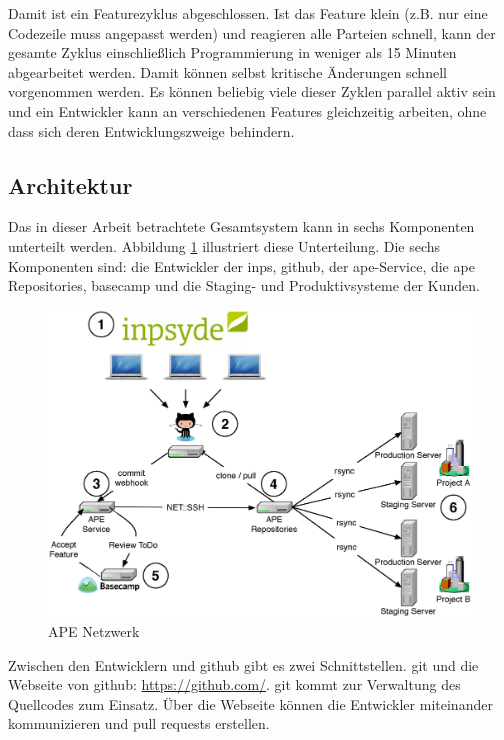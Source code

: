 Damit ist ein Featurezyklus abgeschlossen. Ist das Feature klein (z.B. nur eine Codezeile muss angepasst werden) und reagieren alle Parteien schnell, kann der gesamte Zyklus einschließlich Programmierung in weniger als 15 Minuten abgearbeitet werden. Damit können selbst kritische Änderungen schnell vorgenommen werden. Es können beliebig viele dieser Zyklen parallel aktiv sein und ein Entwickler kann an verschiedenen Features gleichzeitig arbeiten, ohne dass sich deren Entwicklungszweige behindern.


\subsection{Architektur} %
\label{sub:architektur}

Das in dieser Arbeit betrachtete Gesamtsystem kann in sechs Komponenten unterteilt werden. Abbildung \ref{fig:ape_network} illustriert diese Unterteilung. Die sechs Komponenten sind:  die Entwickler der \gls{inps},  \gls{github},  der \gls{ape}-Service,  die \gls{ape} Repositories,  \gls{basecamp} und  die Staging- und Produktivsysteme der Kunden.

\begin{figure}
	\includegraphics[width=1.0\textwidth]{assets/ape_network.eps}
	\caption{APE Netzwerk}
	\label{fig:ape_network}
\end{figure}

Zwischen den Entwicklern und \gls{github} gibt es zwei Schnittstellen. \gls{git} und die Webseite von \gls{github}: \url{https://github.com/}. \gls{git} kommt zur Verwaltung des Quellcodes zum Einsatz. Über die Webseite können die Entwickler miteinander kommunizieren und \glspl{pull request} erstellen.

